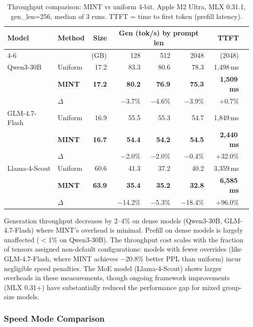 \documentclass{article}
\begin{document}
\begin{table}[h]
\centering
\caption{Throughput comparison: MINT vs uniform 4-bit. Apple M2 Ultra, MLX 0.31.1, gen\_len=256, median of 3 runs. TTFT = time to first token (prefill latency).}
\label{tab:throughput}
\begin{tabular}{llrrrrrr}
\toprule
Model & Method & Size & \multicolumn{3}{c}{Gen (tok/s) by prompt len} & TTFT \\
\cmidrule(lr){4-6}
 & & (GB) & 128 & 512 & 2048 & (2048) \\
\midrule
Qwen3-30B & Uniform & 17.2 & 83.3 & 80.6 & 78.3 & 1{,}498\,ms \\
 & \textbf{MINT} & \textbf{17.2} & \textbf{80.2} & \textbf{76.9} & \textbf{75.3} & \textbf{1{,}509\,ms} \\
 & $\Delta$ & & $-$3.7\% & $-$4.6\% & $-$3.9\% & +0.7\% \\
\midrule
GLM-4.7-Flash & Uniform & 16.9 & 55.5 & 55.3 & 54.7 & 1{,}849\,ms \\
 & \textbf{MINT} & \textbf{16.7} & \textbf{54.4} & \textbf{54.2} & \textbf{54.5} & \textbf{2{,}440\,ms} \\
 & $\Delta$ & & $-$2.0\% & $-$2.0\% & $-$0.4\% & +32.0\% \\
\midrule
Llama-4-Scout & Uniform & 60.6 & 41.3 & 37.2 & 40.2 & 3{,}359\,ms \\
 & \textbf{MINT} & \textbf{63.9} & \textbf{35.4} & \textbf{35.2} & \textbf{32.8} & \textbf{6{,}585\,ms} \\
 & $\Delta$ & & $-$14.2\% & $-$5.3\% & $-$18.4\% & +96.0\% \\
\bottomrule
\end{tabular}
\end{table}

Generation throughput decreases by 2--4\% on dense models (Qwen3-30B, GLM-4.7-Flash) where MINT's overhead is minimal. Prefill on dense models is largely unaffected ($<$1\% on Qwen3-30B). The throughput cost scales with the fraction of tensors assigned non-default configurations: models with fewer overrides (like GLM-4.7-Flash, where MINT achieves $-$20.8\% better PPL than uniform) incur negligible speed penalties. The MoE model (Llama-4-Scout) shows larger overheads in these measurements, though ongoing framework improvements (MLX 0.31+) have substantially reduced the performance gap for mixed group-size models.

\subsubsection{Speed Mode Comparison}
\label{sec:expanded_configs}
\end{document}
